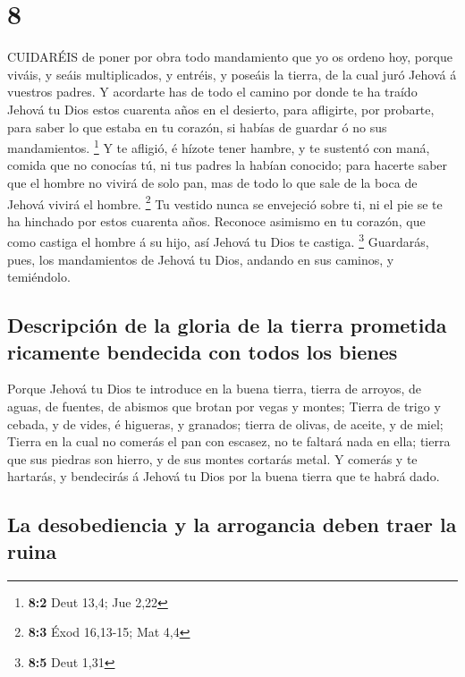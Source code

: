 \hypertarget{section-7}{%
\section{8}\label{section-7}}

 CUIDARÉIS de poner por obra todo mandamiento que yo os
ordeno hoy, porque viváis, y seáis multiplicados, y entréis, y poseáis
la tierra, de la cual juró Jehová á vuestros padres.  Y
acordarte has de todo el camino por donde te ha traído Jehová tu Dios
estos cuarenta años en el desierto, para afligirte, por probarte, para
saber lo que estaba en tu corazón, si habías de guardar ó no sus
mandamientos. \footnote{\textbf{8:2} Deut 13,4; Jue 2,22}  Y
te afligió, é hízote tener hambre, y te sustentó con maná, comida que no
conocías tú, ni tus padres la habían conocido; para hacerte saber que el
hombre no vivirá de solo pan, mas de todo lo que sale de la boca de
Jehová vivirá el hombre. \footnote{\textbf{8:3} Éxod 16,13-15; Mat 4,4}
 Tu vestido nunca se envejeció sobre ti, ni el pie se te ha
hinchado por estos cuarenta años.  Reconoce asimismo en tu
corazón, que como castiga el hombre á su hijo, así Jehová tu Dios te
castiga. \footnote{\textbf{8:5} Deut 1,31}  Guardarás, pues,
los mandamientos de Jehová tu Dios, andando en sus caminos, y
temiéndolo.

\hypertarget{descripciuxf3n-de-la-gloria-de-la-tierra-prometida-ricamente-bendecida-con-todos-los-bienes}{%
\subsection{Descripción de la gloria de la tierra prometida ricamente
bendecida con todos los
bienes}\label{descripciuxf3n-de-la-gloria-de-la-tierra-prometida-ricamente-bendecida-con-todos-los-bienes}}

 Porque Jehová tu Dios te introduce en la buena tierra,
tierra de arroyos, de aguas, de fuentes, de abismos que brotan por vegas
y montes;  Tierra de trigo y cebada, y de vides, é higueras,
y granados; tierra de olivas, de aceite, y de miel;  Tierra
en la cual no comerás el pan con escasez, no te faltará nada en ella;
tierra que sus piedras son hierro, y de sus montes cortarás metal.
 Y comerás y te hartarás, y bendecirás á Jehová tu Dios por
la buena tierra que te habrá dado.

\hypertarget{la-desobediencia-y-la-arrogancia-deben-traer-la-ruina}{%
\subsection{La desobediencia y la arrogancia deben traer la
ruina}\label{la-desobediencia-y-la-arrogancia-deben-traer-la-ruina}}

